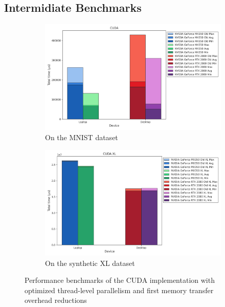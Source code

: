 \documentclass[modern,longauthor]{aastex7}
\begin{document}
\subsection{Intermidiate Benchmarks}\label{subsec:cuda-int-res-1}
\begin{figure}[htb!]
\centering
\begin{subfigure}{.5\textwidth}
  \centering
  \includegraphics[width=\linewidth]{CUDA/CUDA_thread_optimization.png}
  \caption{On the MNIST dataset}
\end{subfigure}%
\begin{subfigure}{.5\textwidth}
  \centering
  \includegraphics[width=\linewidth]{CUDA/CUDA XL_thread_optimization.png}
  \caption{On the synthetic XL dataset}
\end{subfigure}
\caption{Performance benchmarks of the CUDA implementation with optimized thread-level parallelism and first memory transfer overhead reductions}
\label{fig:cuda-intermediate-1}
\end{figure}
\end{document}
